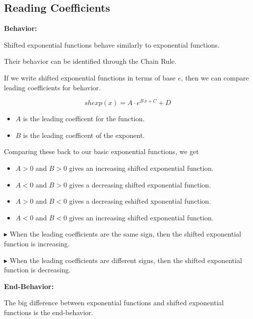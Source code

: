 \documentclass{ximera}
\begin{document}
\subsection*{Reading Coefficients}

\textbf{Behavior:}

Shifted exponential functions behave similarly to exponential functions. 

Their behavior can be identified through the Chain Rule.

If we write shifted exponential functions in terms of base $e$, then we can compare leading coefficients for behavior.

\[
shexp(x) = A \cdot e^{B \, x + C} + D
\]





\begin{itemize}
  \item $A$ is the leading coefficent for the function.
  \item $B$ is the leading coefficent of the exponent.
\end{itemize}


Comparing these back to our basic exponential functions, we get



\begin{itemize}
  \item $A > 0$ and $B > 0$ gives an increasing shifted exponential function.
  \item $A < 0$ and $B > 0$ gives a decreasing shifted exponential function.
  \item $A > 0$ and $B < 0$ gives a decreasing eshifted xponential function.
  \item $A < 0$ and $B < 0$ gives an increasing shifted exponential function.
\end{itemize}


$\blacktriangleright$ When the leading coefficients are the same sign, then the shifted exponential function is increasing. 

$\blacktriangleright$ When the leading coefficients are different signs, then the shifted exponential function is decreasing. 






\textbf{End-Behavior:}


The big difference between exponential functions and shifted exponential functions is the end-behavior. 
\end{document}

